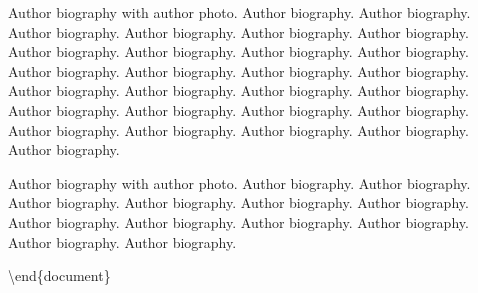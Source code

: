 \documentclass[]{elsarticle} %
\begin{document}

Author biography with author photo. Author biography. Author biography.
Author biography. Author biography. Author biography. Author biography.
Author biography. Author biography. Author biography. Author biography.
Author biography. Author biography. Author biography. Author biography.
Author biography. Author biography. Author biography. Author biography.
Author biography. Author biography. Author biography. Author biography.
Author biography. Author biography. Author biography. Author biography.
Author biography. \endbio


Author biography with author photo. Author biography. Author biography.
Author biography. Author biography. Author biography. Author biography.
Author biography. Author biography. Author biography. Author biography.
Author biography. Author biography. \endbio

\textbackslash{}end\{document\}
\end{document}
